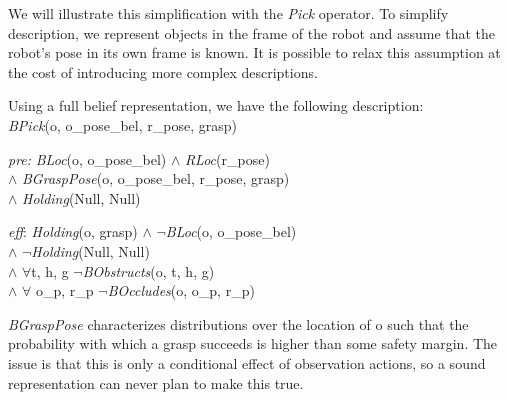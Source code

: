 We will illustrate this simplification with the \emph{Pick}
operator. To simplify description, we represent objects in the frame
of the robot and assume that the robot's pose in its own frame is
known. It is possible to relax this assumption at the cost of
introducing more complex descriptions.

Using a full belief representation, we have the following
description:\\
\emph{BPick}(o, o\_pose\_bel, r\_pose, grasp)
\vspace{-2pt}
\begin{tightlist}
\item[\emph{pre:}] \emph{BLoc}(o, o\_pose\_bel) $\wedge$
  \emph{RLoc}(r\_pose) \\$\wedge$ \emph{BGraspPose}(o, o\_pose\_bel,
  r\_pose, grasp) \\$\wedge$ \emph{Holding}(Null, Null)
\item[\emph{eff}:] \emph{Holding}(o, grasp) $\wedge$
  $\lnot$\emph{BLoc}(o, o\_pose\_bel) \\$\wedge$
  $\lnot$\emph{Holding}(Null, Null) \\$\wedge$ $\forall$t, h, g
  $\lnot$\emph{BObstructs}(o, t, h, g)\\$\wedge$ $\forall$ o\_p,
  r\_p $\lnot$\emph{BOccludes}(o, o\_p, r\_p)
\end{tightlist}
\emph{BGraspPose} characterizes distributions over the location of o
such that the probability with which a grasp succeeds is higher than
some safety margin. The issue is that this is only a conditional
effect of observation actions, so a sound representation can never
plan to make this true.  

